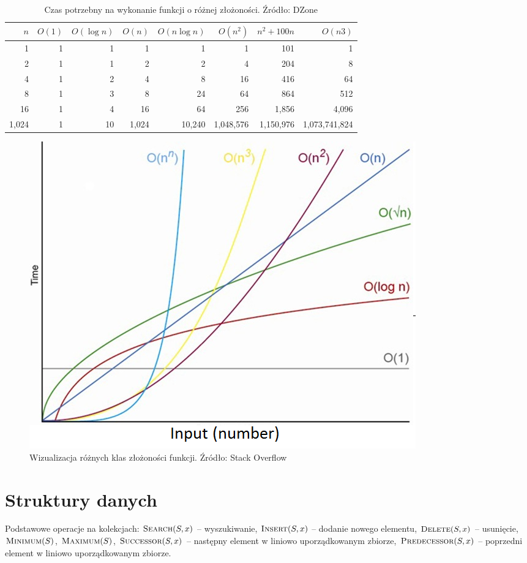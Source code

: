 \documentclass[10pt, oneside]{article}
\theoremstyle{remark}
\begin{document}
\begin{table}[]
\caption{Czas potrzebny na wykonanie funkcji o różnej złożoności. Źródło: DZone}
\centering
\begin{tabular}{@{}rrrrrrrr@{}}
\toprule
$n$ & $O(1)$ & $O(\log n)$ & $O(n)$ & $O(n \log n)$ & $O(n^2)$ & $ n^2 +100n$ & $O(n3)$ \\ \midrule
1 & 1 & 1 & 1 & 1 & 1 & 101 & 1 \\
2 & 1 & 1 & 2 & 2 & 4 & 204 & 8 \\
4 & 1 & 2 & 4 & 8 & 16 & 416 & 64 \\
8 & 1 & 3 & 8 & 24 & 64 & 864 & 512 \\
16 & 1 & 4 & 16 & 64 & 256 & 1,856 & 4,096 \\
1,024 & 1 & 10 & 1,024 & 10,240 & 1,048,576 & 1,150,976 & 1,073,741,824 \\
\bottomrule
\end{tabular}
\end{table}

\begin{figure}
	\centering
	\includegraphics[width=.4\textwidth]{figures/complexities}
	\caption{Wizualizacja różnych klas złożoności funkcji. Źródło: Stack Overflow}
\end{figure}



\section{Struktury danych}
Podstawowe operacje na kolekcjach: $\Call{Search}{S, x}$ -- wyszukiwanie, $\Call{Insert}{S, x}$ -- dodanie nowego elementu, $\Call{Delete}{S, x}$ -- usunięcie, $\Call{Minimum}{S}$, $\Call{Maximum}{S}$, $\Call{Successor}{S, x}$ -- następny element w liniowo uporządkowanym zbiorze, $\Call{Predecessor}{S, x}$ -- poprzedni element w liniowo uporządkowanym zbiorze.
\end{document}
